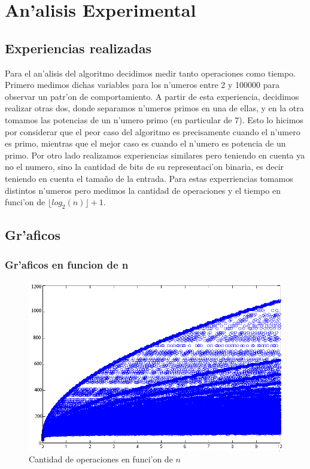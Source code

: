 \section{An'alisis Experimental}
\subsection{Experiencias realizadas}
Para el an'alisis del algoritmo decidimos medir tanto operaciones como tiempo. Primero medimos dichas variables 
para los n'umeros entre 2 y 100000 para observar un patr'on de comportamiento. A partir de esta experiencia, 
decidimos realizar otras dos, donde separamos n'umeros primos en una de ellas, y en la otra tomamos las potencias 
de un n'umero primo (en particular de 7). Esto lo hicimos por considerar que el peor caso del algoritmo es 
precisamente cuando el n'umero es primo, mientras que el mejor caso es cuando el n'umero es potencia de un primo. 
Por otro lado realizamos experiencias similares pero teniendo en cuenta ya no el numero, sino la cantidad de bits 
de su representaci'on binaria, es decir teniendo en cuenta el tama\~{n}o de la entrada. Para estas experriencias 
tomamos distintos n'umeros pero medimos la cantidad de operaciones y el tiempo en funci'on de $\lfloor log_2(n) \rfloor + 1$.


\subsection{Gr'aficos}
\subsubsection{Gr'aficos en funcion de n}

\begin{figure}[H]
\centering
\includegraphics[scale=0.7]{../../codigo/ejercicio1/benchmark/graficos/todos_los_numeros/graficosTodos.png}
\caption{Cantidad de operaciones en funci'on de $n$}
\end{figure}

